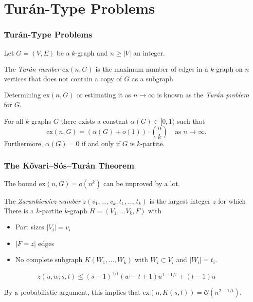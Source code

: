 \documentclass[aspectratio=169]{beamer}
\newcommand{\ex}[2]{\ensuremath{\text{ex} \left( #1, #2 \right)}}
\newcommand{\compdots}[2]{\ensuremath{K\left(#1, \dots, #2\right)}} %
\newcommand{\bigO}[1]{\ensuremath{\mathcal{O}\left(#1\right)}}
\theoremstyle{mystyle}
\begin{document}
\section{Turán-Type Problems}\label{sec:turan-type}

\begin{frame}
    \frametitle{Turán-Type Problems}
    \begin{definition}
        Let $G = (V, E)$ be a $k$-graph and $n \geq |V|$ an integer.

        The \emph{Turán number} $\ex{n}{G}$ is the maximum number of edges in a $k$-graph on $n$ vertices
        that does not contain a copy of $G$ as a subgraph.
    \end{definition}
    Determining $\ex{n}{G}$ or estimating it as $n \to \infty$ is known as the \emph{Turán problem} for $G$.
    \begin{theorem}
        For all $k$-graphs $G$ there exists a constant $\alpha (G) \in [0, 1)$ such that
        \[
            \ex{n}{G} = (\alpha (G) + o(1)) \cdot \binom{n}{k} \quad \text{as } n \to \infty.
        \]
        Furthermore, $\alpha (G) = 0$ if and only if $G$ is $k$-partite.
    \end{theorem}
\end{frame}

\begin{frame}
    \frametitle{The Kővari--Sós--Turán Theorem}
    The bound $\ex{n}{G} = o(n^k)$ can be improved by a lot.
    \begin{definition}
        The \emph{Zarankiewicz number} $z(v_1, \dots, v_k; t_1, \dots, t_k)$
        is the largest integer $z$ for which
        There is a $k$-partite $k$-graph
        $H = (V_1, \dots V_k, F)$  with
         \begin{itemize}
             \item Part sizes $|V_i| = v_i$
             \item $|F = z|$ edges
             \item No complete subgraph $\compdots{W_1}{W_k}$ with $W_i \subset V_i$ and $|W_i| = t_i$.
         \end{itemize}
    \end{definition}

    \begin{theorem}
        \[z(u, w; s, t) \leq (s - 1)^{1 / t}(w - t + 1)u^{1 - 1 / t} + (t - 1)u\]
    \end{theorem}
    By a probabilistic argument, this implies that
    $\ex{n}{K(s, t)} = \bigO{n^{2 - 1 / t}}$.
\end{frame}
\end{document}
